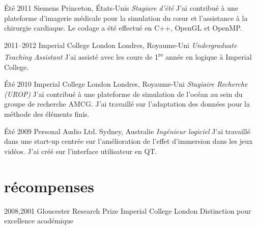 \documentclass[]{friggeri-cv} %
\begin{document}
\begin{entrylist}

\entry
{Été 2011}
{Siemens}
{Princeton, États-Unis}
{\emph{Stagiare d'été}
\medbreak
J’ai contribué à une plateforme d’imagerie médicale pour la simulation du cœur et
l’assistance à la chirurgie cardiaque. Le codage a été effectué
en C++, OpenGL et OpenMP.
\bigbreak
}

\entry
{2011--2012}
{Imperial College London}
{Londres, Royaume-Uni}
{\emph{Undergraduate Teaching Assistant}
\medbreak
    J’ai assisté avec les cours de 1\textsuperscript{re} année en logique à Imperial College.
\bigbreak
}

\entry
{Été 2010}
{Imperial College London}
{Londres, Royaume-Uni}
    {\emph{Stagiaire Recherche (UROP)}
	\medbreak
    J’ai contribué à une plateforme de simulation de l’océan au sein du groupe
    de recherche AMCG. J’ai travaillé 
    sur l'adaptation des données pour la méthode des éléments finis.
	\bigbreak
}

\entry
{Été 2009}
{Personal Audio Ltd.}
{Sydney, Australie}
    {\emph{Ingénieur logiciel}
	\medbreak
    J’ai travaillé dans une start-up centrée sur l’amélioration de l’effet d'immersion dans les
    jeux vidéos. J’ai créé sur l’interface utilisateur en QT.
	\bigbreak
}


\end{entrylist}


\section{récompenses}

\begin{entrylist}


\entry
{2008,2001}
{Gloucester Research Prize}
{Imperial College London}
{Distinction pour excellence académique}


\end{entrylist}


\end{document}
